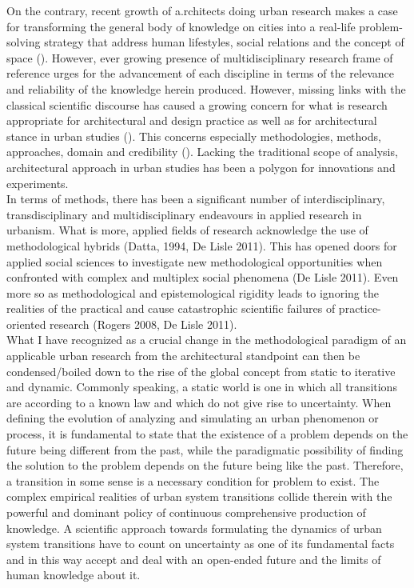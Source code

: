 \documentclass[11pt]{report}
\begin{document}
On the contrary, recent growth of a.rchitects doing urban research makes a case for transforming the general body of knowledge on cities into a real-life problem-solving strategy that address human lifestyles, social relations and the concept of space (\href{Castells 2000, Dijk 2002 add more}{\citealt{Castells 2000, Dijk 2002 add more}}).
However, ever growing presence of multidisciplinary research frame of reference urges for the advancement of each discipline in terms of the relevance and reliability of the knowledge herein produced.
However, missing links with the classical scientific discourse has caused a growing concern for what is research appropriate for architectural and design practice as well as for architectural stance in urban studies (\href{ref}{\citealt{ref}}). This concerns especially methodologies, methods, approaches, domain and credibility (\href{ref+Savic 2016b}{\citealt{ref+Savic 2016b}}). Lacking the traditional scope of analysis, architectural approach in urban studies has been a polygon for innovations and experiments.
\\
In terms of methods, there has been a significant number of interdisciplinary, transdisciplinary and multidisciplinary endeavours in applied research in urbanism. What is more, applied fields of research acknowledge the use of methodological hybrids (Datta, 1994, De Lisle 2011). This has opened doors for applied social sciences to investigate new methodological opportunities when confronted with complex and multiplex social phenomena (De Lisle 2011). Even more so as methodological and epistemological rigidity leads to ignoring the realities of the practical and cause catastrophic scientific failures of practice-oriented research (Rogers 2008, De Lisle 2011).
\\
What I have recognized as a crucial change in the methodological paradigm of an applicable urban research from the architectural standpoint can then be condensed/boiled down to the rise of the global concept from static to iterative and dynamic. Commonly speaking, a static world is one in which all transitions are according to a known law and which do not give rise to uncertainty. When defining the evolution of analyzing and simulating an urban phenomenon or process, it is fundamental to state that the existence of a problem depends on the future being different from the past, while the paradigmatic possibility of finding the solution to the problem depends on the future being like the past. Therefore, a transition in some sense is a necessary condition for problem to exist. The complex empirical realities of urban system transitions collide therein with the powerful and dominant policy of continuous comprehensive production of knowledge. A scientific approach towards formulating the dynamics of urban system transitions have to count on uncertainty as one of its fundamental facts and in this way accept and deal with an open-ended future and the limits of human knowledge about it.
\end{document}
